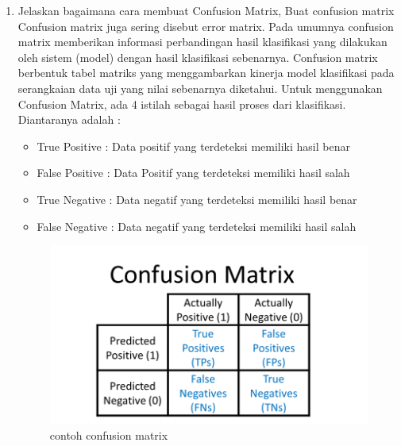 \begin{enumerate}
\item Jelaskan bagaimana cara membuat Confusion Matrix, Buat confusion matrix
\hfill\\
	Confusion matrix juga sering disebut error matrix. Pada umumnya confusion matrix memberikan informasi perbandingan hasil klasifikasi yang dilakukan oleh sistem (model) dengan hasil klasifikasi sebenarnya. Confusion matrix berbentuk tabel matriks yang menggambarkan kinerja model klasifikasi pada serangkaian data uji yang nilai sebenarnya diketahui. Untuk menggunakan Confusion Matrix, ada 4 istilah sebagai hasil proses dari klasifikasi. Diantaranya adalah :
\begin{itemize}
    \item True Positive : Data positif yang terdeteksi memiliki hasil benar
    \item False Positive : Data Positif yang terdeteksi memiliki hasil salah
    \item True Negative : Data negatif yang terdeteksi memiliki hasil benar
    \item False Negative : Data negatif yang terdeteksi memiliki hasil salah
\end{itemize}
\begin{figure}[H]
    \includegraphics[width=12cm]{figures/1174084/2/6.png}
    \centering
    \caption{contoh confusion matrix}
\end{figure}	


\end{enumerate}
